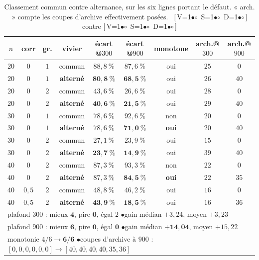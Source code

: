 \documentclass[11pt,a4paper]{article}
\theoremstyle{plain}
\theoremstyle{remark}
\newcommand{\cfgm}[1]{\ifnum#1=1$\bullet$\else$\circ$\fi}
\newcommand{\conf}[3]{%
  \textsf{\footnotesize[\,V\cfgm{#1}\ S\cfgm{#2}\ D\cfgm{#3}\,]}}
\begin{document}
\begin{table}[H]
\centering
\caption{Classement commun contre alternance, sur les six lignes portant le
défaut. « arch. » compte les coupes d'archive effectivement posées.\ \conf{0}{1}{1} contre \conf{1}{1}{1}}
\label{tab:alternance}
\setlength{\tabcolsep}{5pt}
\begin{tabular}{ccccccccc}
\toprule
$n$ & corr & gr. & vivier & écart @$300$ & écart @$900$ & monotone
 & arch.@$300$ & arch.@$900$\\
\midrule
$20$ & $0$ & $1$ & commun & $88{,}8\ \%$ & $87{,}6\ \%$ & oui & $25$ & $0$\\
$20$ & $0$ & $1$ & \textbf{alterné} & $\mathbf{80{,}8\ \%}$ & $\mathbf{68{,}5\ \%}$ & oui & $26$ & $40$\\
\midrule
$20$ & $0$ & $2$ & commun & $43{,}6\ \%$ & $26{,}6\ \%$ & oui & $28$ & $0$\\
$20$ & $0$ & $2$ & \textbf{alterné} & $\mathbf{40{,}6\ \%}$ & $\mathbf{21{,}5\ \%}$ & oui & $29$ & $40$\\
\midrule
$30$ & $0$ & $1$ & commun & $78{,}6\ \%$ & $92{,}6\ \%$ & non & $20$ & $0$\\
$30$ & $0$ & $1$ & \textbf{alterné} & $78{,}6\ \%$ & $\mathbf{71{,}0\ \%}$ & \textbf{oui} & $20$ & $40$\\
\midrule
$30$ & $0$ & $2$ & commun & $27{,}1\ \%$ & $23{,}9\ \%$ & oui & $15$ & $0$\\
$30$ & $0$ & $2$ & \textbf{alterné} & $\mathbf{23{,}7\ \%}$ & $\mathbf{14{,}9\ \%}$ & oui & $39$ & $40$\\
\midrule
$40$ & $0$ & $2$ & commun & $87{,}3\ \%$ & $93{,}3\ \%$ & non & $22$ & $0$\\
$40$ & $0$ & $2$ & \textbf{alterné} & $87{,}3\ \%$ & $\mathbf{84{,}5\ \%}$ & \textbf{oui} & $22$ & $35$\\
\midrule
$40$ & $0{,}5$ & $2$ & commun & $48{,}8\ \%$ & $46{,}2\ \%$ & oui & $16$ & $0$\\
$40$ & $0{,}5$ & $2$ & \textbf{alterné} & $\mathbf{43{,}9\ \%}$ & $\mathbf{18{,}5\ \%}$ & oui & $16$ & $36$\\
\midrule
\multicolumn{9}{l}{plafond $300$ : mieux $\mathbf{4}$, pire $\mathbf{0}$,
 égal $2$ \quad$\bullet$\quad gain médian $+3{,}24$, moyen $+3{,}23$}\\
\multicolumn{9}{l}{plafond $900$ : mieux $\mathbf{6}$, pire $\mathbf{0}$,
 égal $\mathbf{0}$ \quad$\bullet$\quad gain médian $\mathbf{+14{,}04}$,
 moyen $+15{,}22$}\\
\multicolumn{9}{l}{monotonie $4/6\to\mathbf{6/6}$ \quad$\bullet$\quad coupes
 d'archive à $900$ : $[0,0,0,0,0,0]\to[40,40,40,40,35,36]$}\\
\bottomrule
\end{tabular}
\end{table}
\end{document}

